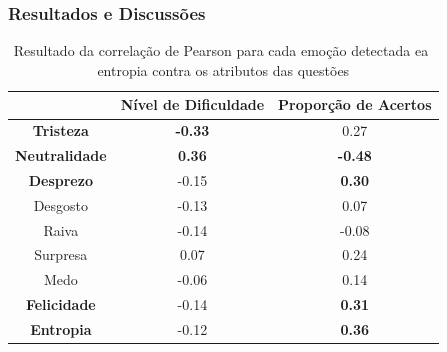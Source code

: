 \documentclass{beamer}
\begin{document}
\begin{frame}
\frametitle{Resultados e Discuss\~oes}
\begin{table}[]\footnotesize
\centering
\caption{Resultado​ ​da​ ​correla\c{c}\~ao​ ​de​ ​Pearson​ ​para​ ​cada​ ​emo\c{c}\~ao​ ​detectada
e​ ​a​ ​entropia​ ​contra​ ​os​ ​atributos​ ​das​ ​quest\~oes}
\label{my-label}
\begin{tabular}{|c|c|c|}
\hline
                      & \textbf{Nível de Dificuldade} & \textbf{Proporção de Acertos} \\ \hline
\textbf{Tristeza}     & \textbf{-0.33}                & 0.27                          \\ \hline
\textbf{Neutralidade} & \textbf{0.36}                 & \textbf{-0.48}                \\ \hline
\textbf{Desprezo}     & -0.15                         & \textbf{0.30}                 \\ \hline
Desgosto              & -0.13                         & 0.07                          \\ \hline
Raiva                 & -0.14                         & -0.08                         \\ \hline
Surpresa              & 0.07                          & 0.24                          \\ \hline
Medo                  & -0.06                         & 0.14                          \\ \hline
\textbf{Felicidade}   & -0.14                         & \textbf{0.31}                 \\ \hline
\textbf{Entropia}     & -0.12                         & \textbf{0.36}                 \\ \hline
\end{tabular}
\end{table}
\end{frame}


\end{document}
